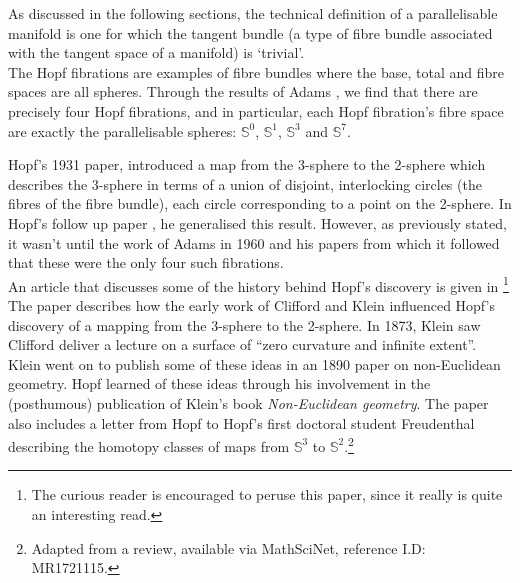 \documentclass[12pt,a4paper]{article}
\numberwithin{equation}{section}
\theoremstyle{definition}
\theoremstyle{remark}
\begin{document}
As discussed in the following sections, the technical definition of a parallelisable manifold is one for which the tangent bundle (a type of fibre bundle associated with the tangent space of a manifold) is `trivial'.\\

The Hopf fibrations are examples of fibre bundles where the base, total and fibre spaces are all spheres. Through the results of Adams \cite{MR0141119}, we find that there are precisely four Hopf fibrations, and in particular, each Hopf fibration's fibre space are exactly the parallelisable spheres: $\mathbb{S}^0$, $\mathbb{S}^1$, $\mathbb{S}^3$ and $\mathbb{S}^7$.\\

\pagebreak

Hopf's 1931 paper, \cite{MR1512691} introduced a map from the 3-sphere to the 2-sphere which describes the 3-sphere in terms of a union of disjoint, interlocking circles (the fibres of the fibre bundle), each circle corresponding to a point on the 2-sphere. In Hopf's follow up paper \cite{Hopf1935}, he generalised this result. However, as previously stated, it wasn't until the work of Adams in 1960 and his papers \cite{MR0141119,MR0139178} from which it followed that these were the only four such fibrations.\\


%
An article that discusses some of the history behind Hopf's discovery is given in \cite{MR1721115}\footnote{The curious reader is encouraged to peruse this paper, since it really is quite an interesting read.}
The paper describes how the early work of Clifford and Klein influenced Hopf's discovery of a mapping from the 3-sphere to the 2-sphere. In 1873, Klein saw Clifford deliver a lecture on a surface of ``zero curvature and infinite extent''. Klein went on to publish some of these ideas in an 1890 paper on non-Euclidean geometry. Hopf learned of these ideas through his involvement in the (posthumous) publication of Klein's book \textit{Non-Euclidean geometry}. The paper also includes a letter from Hopf to Hopf’s first doctoral student Freudenthal describing the homotopy classes of maps from $\mathbb{S}^3$ to $\mathbb{S}^2$.\footnote{Adapted from a review, available via MathSciNet, reference I.D: MR1721115.}
\pagebreak
\end{document}
